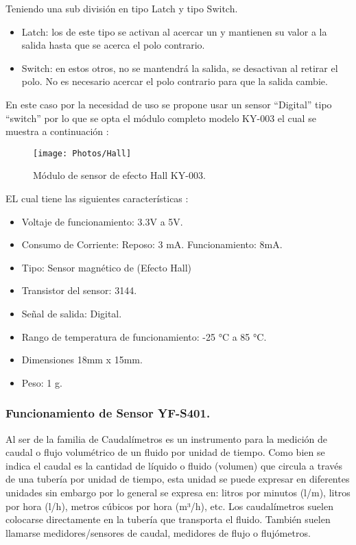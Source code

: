 \documentclass[11pt,letter
								]
								{article}
\begin{document}
Teniendo una sub división en tipo Latch y tipo Switch.

\begin{itemize}
\item Latch: los de este tipo se activan al acercar un y mantienen su valor a la salida hasta que se acerca el polo contrario.\\

\item Switch: en estos otros, no se mantendrá la salida, se desactivan al retirar el polo. No es necesario acercar el polo contrario para que la salida cambie.\\
\end{itemize}

\newpage

En este caso por la necesidad de uso se propone usar  un sensor  ``Digital'' tipo ``switch'' por lo que se opta  el módulo completo modelo KY-003  el cual se muestra a continuación :\\

\begin{figure}[H]
\centering
\texttt{[image: Photos/Hall]}
\caption{Módulo de sensor de efecto Hall KY-003. \cite{hallunit}} 
\end{figure}
 


EL cual tiene las siguientes características :
\begin{itemize}

\item Voltaje de funcionamiento: 3.3V a 5V.
\item Consumo de Corriente: Reposo: 3 mA. Funcionamiento: 8mA.
\item Tipo: Sensor magnético de (Efecto Hall)
\item Transistor del sensor: 3144.
\item Señal de salida: Digital.
\item Rango de temperatura de funcionamiento: -25 °C a 85 °C.
\item Dimensiones 18mm x 15mm.
\item Peso: 1 g.

\end{itemize}

\newpage
\subsubsection{Funcionamiento de Sensor YF-S401. }

Al ser de la familia de Caudalímetros es un instrumento para la medición de caudal o flujo  volumétrico de un fluido por unidad de tiempo. Como bien se indica el caudal es la cantidad de líquido o fluido (volumen) que circula a través de una tubería por unidad de tiempo,  esta unidad se puede expresar en diferentes unidades sin embargo por lo general se expresa en: litros por minutos (l/m), litros por hora (l/h), metros cúbicos por hora (m³/h), etc. Los caudalímetros suelen colocarse directamente en la tubería que transporta el fluido. También suelen llamarse medidores/sensores de caudal, medidores de flujo o flujómetros. \\
\end{document}
